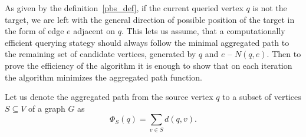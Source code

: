 As given by the definition~\ref{pbs_def}, if the current queried vertex $q$ is not the target, we are left with the general direction of possible position of the target in the form of edge $e$ adjacent on $q$. This lets us assume, that a computationally efficient querying stategy should always follow the minimal aggregated path to the remaining set of candidate vertices, generated by $q$ and $e$ -- $N(q, e)$. Then to prove the efficiency of the algorithm it is enough to show that on each iteration the algorithm minimizes the aggregated path function.


\begin{definition}
Let us denote the aggregated path from the source vertex $q$ to a subset of vertices $S \subseteq V$ of a graph $G$ as
	\[\Phi_S(q) = \sum \limits_{v \in S} d(q, v).\]
\end{definition}


